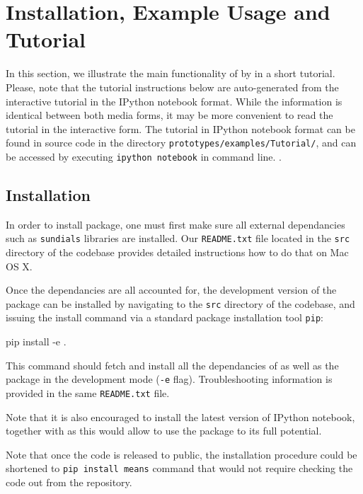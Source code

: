 \section{Installation, Example Usage and Tutorial} \label{examples}
In this section, we illustrate the main functionality of \means{} by in a short tutorial.
Please, note that the tutorial instructions below are auto-generated from the interactive tutorial in the IPython notebook format. 
While the information is identical between both media forms, it may be more convenient to read the tutorial in the interactive form. 
The tutorial in  IPython notebook format can be found in \means{} source code in the directory  \verb"prototypes/examples/Tutorial/", and can be accessed by executing \texttt{ipython notebook} in command line.
.

\subsection{Installation}

In order to install \means{} package, one must first make sure all external dependancies such as \verb"sundials" libraries  are installed. Our \verb"README.txt" file located in the \verb"src" directory of the codebase provides detailed instructions how to do that on Mac OS X.

Once the dependancies are all accounted for, the development version of the \means{} package can be installed by navigating to the \verb"src" directory of the codebase, and issuing the install command via a standard \py{} package installation tool \verb"pip":

\begin{InputVerbatim}
pip install -e .
\end{InputVerbatim}

This command should fetch and install all the dependancies of \means{} as well as the package in the development mode (\verb"-e" flag). Troubleshooting information is provided in the same \verb"README.txt" file.

Note that it is also encouraged to install the latest version of  IPython notebook\cite{perez_ipython:_2007}, together with \means{} as this would allow to use the package to its full potential.

Note that once the code is released to public, the installation procedure could be shortened to \verb"pip install means" command that would not require checking the code out from the repository.

